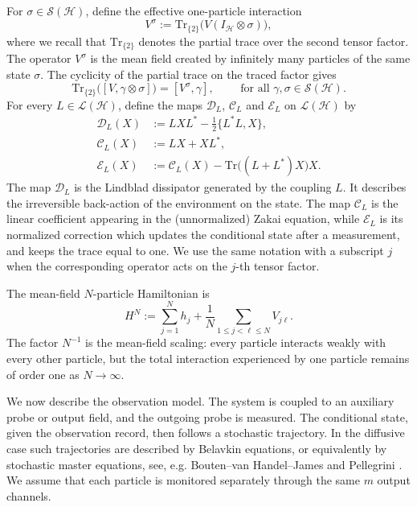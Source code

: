 \documentclass[10pt,a4paper,reqno]{amsart}
\numberwithin{equation}{section}
\theoremstyle{plain}
\theoremstyle{definition}
\theoremstyle{remark}
\newcommand{\Tr}{\mathrm{Tr}}
\newcommand{\cS}{\mathcal S}
\newcommand{\cL}{\mathcal L}
\newcommand{\cD}{\mathcal D}
\newcommand{\cC}{\mathcal C}
\newcommand{\cE}{\mathcal E}
\newcommand{\HH}{\mathcal H}
\newcommand{\1}{\mathbf 1}
\begin{document}
\medskip

For $\sigma\in\cS(\HH)$, define the effective one-particle interaction
\begin{equation}
  V^\sigma
  :=
  \Tr_{\{2\}}
  \bigl(
    V(I_{\HH}\otimes\sigma)
  \bigr),
  \label{eq:effective-potential}
\end{equation}
where we recall that $\Tr_{\{2\}}$ denotes the partial trace over the second tensor factor. The operator \(V^\sigma\) is the mean field created by infinitely many particles of the same  state 
\(\sigma\).  
The cyclicity of the partial trace on the traced factor gives
\begin{equation}
  \Tr_{\{2\}}
  \bigl(
    [V,\gamma\otimes\sigma]
  \bigr)
  =
  [V^\sigma,\gamma],
  \qquad \mbox{ for all }
  \gamma,\sigma\in\cS(\HH).
  \label{eq:effective-commutator}
\end{equation}
For every $L\in\cL(\HH)$, define the maps $\cD_L$,  $\cC_L$ and $\cE_L$ on $\cL(\HH)$ by
\begin{align}
  \cD_L(X)
  &:=
  LXL^*-\frac12\{L^*L,X\},
  \label{eq:D-def}
  \\
  \cC_L(X)
  &:=
  LX+XL^*,
  \label{eq:C-def}
  \\
  \cE_L(X)
  &:=
  \cC_L(X)
  -
  \Tr\bigl((L+L^*)X\bigr)X.
  \label{eq:E-def}
\end{align}
The map $\cD_L$ is the Lindblad dissipator generated by the coupling \(L\).
It describes the irreversible back-action of the environment on the state.  The
map $\cC_L$ is the linear coefficient appearing in the (unnormalized) Zakai 
equation, while $\cE_L$ is its normalized correction
which updates the conditional state after a measurement,  and
keeps the trace equal to one.  We use the same notation with a subscript \(j\)
when the corresponding operator acts on the \(j\)-th tensor factor.

\medskip

The mean-field $N$-particle Hamiltonian is
\begin{equation}
  H^N
  :=
  \sum_{j=1}^N h_j
  +
  \frac1N
  \sum_{1\le j<\ell\le N}
  V_{j\ell}.
  \label{eq:HN}
\end{equation}
The factor $N^{-1}$ is the mean-field scaling: every particle interacts weakly
with every other particle, but the total interaction experienced by one
particle remains of order one as $N\longrightarrow\infty$.

\medskip

We now describe the observation model.  The system is coupled to an
auxiliary probe or output field, and the outgoing probe is measured.  The
conditional state, given the observation record, then follows a stochastic
trajectory.  In the diffusive case such trajectories are described by Belavkin
equations, or equivalently by stochastic master equations,  see, e.g.  Bouten--van Handel--James \cite{bouten2007} and Pellegrini
\cite{pellegrini2008}.  We assume that each particle is monitored
separately through the same \(m\) output channels.
\end{document}
